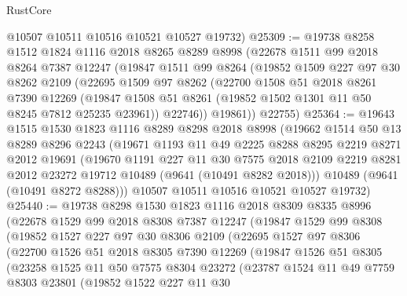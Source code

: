 \begin{lexlean}{RustCore}
\begin{coremodule}
      @10507
      @10511
      @10516
      @10521
      @10527
      @19732)
@25309 := @19738
    @8258
    @1512
    @1824
    @1116
    @2018
    @8265
    @8289
    @8998
    (@22678
      @1511
      @99
      @2018
      @8264
      @7387
      @12247
      (@19847
        @1511
        @99
        @8264
        (@19852
          @1509
          @227
          @97
          @30
          @8262
          @2109
          (@22695
            @1509
            @97
            @8262
            (@22700
              @1508
              @51
              @2018
              @8261
              @7390
              @12269
              (@19847 @1508 @51 @8261 (@19852 @1502 @1301 @11 @50 @8245 @7812 @25235 @23961))
              @22746))
          @19861))
      @22755)
@25364 := @19643
    @1515
    @1530
    @1823
    @1116
    @8289
    @8298
    @2018
    @8998
    (@19662
      @1514
      @50
      @13
      @8289
      @8296
      @2243
      (@19671
        @1193
        @11
        @49
        @2225
        @8288
        @8295
        @2219
        @8271
        @2012
        @19691
        (@19670
          @1191
          @227
          @11
          @30
          @7575
          @2018
          @2109
          @2219
          @8281
          @2012
          @23272
          @19712
          @10489
          (@9641 (@10491 @8282 @2018)))
        @10489
        (@9641 (@10491 @8272 @8288)))
      @10507
      @10511
      @10516
      @10521
      @10527
      @19732)
@25440 := @19738
    @8298
    @1530
    @1823
    @1116
    @2018
    @8309
    @8335
    @8996
    (@22678
      @1529
      @99
      @2018
      @8308
      @7387
      @12247
      (@19847
        @1529
        @99
        @8308
        (@19852
          @1527
          @227
          @97
          @30
          @8306
          @2109
          (@22695
            @1527
            @97
            @8306
            (@22700
              @1526
              @51
              @2018
              @8305
              @7390
              @12269
              (@19847
                @1526
                @51
                @8305
                (@23258
                  @1525
                  @11
                  @50
                  @7575
                  @8304
                  @23272
                  (@23787
                    @1524
                    @11
                    @49
                    @7759
                    @8303
                    @23801
                    (@19852
                      @1522
                      @227
                      @11
                      @30

\end{coremodule}
\end{lexlean}
